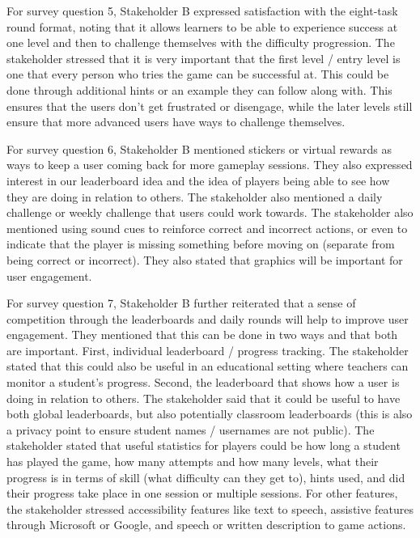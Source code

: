 \documentclass{article}
\begin{document}
For survey question 5, Stakeholder B expressed satisfaction with the eight-task round format, noting that it allows learners to be able to experience success at one level and then to challenge themselves with the difficulty progression. The stakeholder stressed that it is very important that the first level / entry level is one that every person who tries the game can be successful at. This could be done through additional hints or an example they can follow along with. This ensures that the users don't get frustrated or disengage, while the later levels still ensure that more advanced users have ways to challenge themselves.

For survey question 6, Stakeholder B mentioned stickers or virtual rewards as ways to keep a user coming back for more gameplay sessions. They also expressed interest in our leaderboard idea and the idea of players being able to see how they are doing in relation to others. The stakeholder also mentioned a daily challenge or weekly challenge that users could work towards. The stakeholder also mentioned using sound cues to reinforce correct and incorrect actions, or even to indicate that the player is missing something before moving on (separate from being correct or incorrect). They also stated that graphics will be important for user engagement.

For survey question 7, Stakeholder B further reiterated that a sense of competition through the leaderboards and daily rounds will help to improve user engagement. They mentioned that this can be done in two ways and that both are important. First, individual leaderboard / progress tracking. The stakeholder stated that this could also be useful in an educational setting where teachers can monitor a student's progress. Second, the leaderboard that shows how a user is doing in relation to others. The stakeholder said that it could be useful to have both global leaderboards, but also potentially classroom leaderboards (this is also a privacy point to ensure student names / usernames are not public). The stakeholder stated that useful statistics for players could be how long a student has played the game, how many attempts and how many levels, what their progress is in terms of skill (what difficulty can they get to), hints used, and did their progress take place in one session or multiple sessions. For other features, the stakeholder stressed accessibility features like text to speech, assistive features through Microsoft or Google, and speech or written description to game actions.
\end{document}
